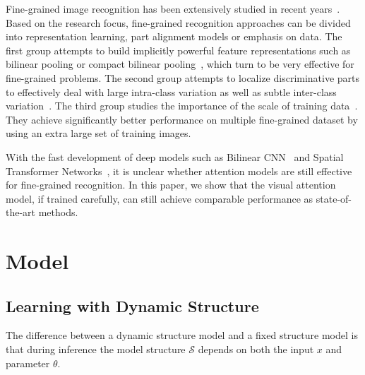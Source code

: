 \documentclass[10pt,twocolumn,letterpaper]{article}
\begin{document}
Fine-grained image recognition has been extensively studied in recent years~\cite{bossard2014food, berg2014birdsnap, cui2016fine, huang2016part, krause2015fine, krause20133d, khosla2011novel, liu2012dog, nilsback2008automated}.
Based on the research focus, fine-grained recognition approaches can be divided into representation learning, part alignment models or emphasis on data.
The first group attempts to build implicitly powerful feature representations such as bilinear pooling or compact bilinear pooling~\cite{gao2016compact, kong2016low, lin2015bilinear}, which turn to be very effective for fine-grained problems.
The second group attempts to localize discriminative parts to effectively deal with large intra-class variation as well as subtle inter-class variation~\cite{berg2013poof, branson2014bird, gavves2013fine, huang2016part, liu2016localizing}.
The third group studies the importance of the scale of training data~\cite{krause2016unreasonable}.
They achieve significantly better performance on multiple fine-grained dataset by using an extra large set of training images.

With the fast development of deep models such as Bilinear CNN~\cite{lin2015bilinear} and Spatial Transformer Networks~\cite{jaderberg2015spatial}, it is unclear whether attention models are still effective for fine-grained recognition.
In this paper, we show that the visual attention model, if trained carefully, can still achieve comparable performance as  state-of-the-art methods.

\section{Model}

\subsection{Learning with Dynamic Structure}

The difference between a dynamic structure model and a fixed structure model is that during inference the model structure $\mathcal{S}$ depends on both the input $x$ and parameter $\theta$.
\end{document}
